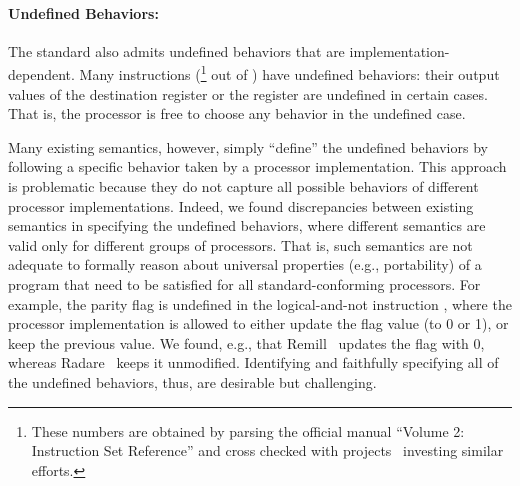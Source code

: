 


\paragraph{Undefined Behaviors:}
%
The \ISA standard also admits undefined behaviors that are implementation-dependent.
Many instructions (\undefIntel{}\footnote{\label{note1}These numbers are obtained by parsing the official manual ``Volume 2: Instruction Set Reference'' and cross checked with projects~\cite{Stoke2013, Felix} investing similar efforts.} out of \totalIntel{}) have undefined behaviors: their output values of the destination register or the  register are undefined in certain cases.
That is, the processor is free to choose any behavior in the undefined case.
%

Many existing semantics, however, simply ``define'' the undefined behaviors by
following a specific behavior taken by a processor implementation.
This approach is problematic because they do not capture all possible behaviors of different processor implementations.
Indeed, we found discrepancies between existing semantics in specifying the undefined behaviors, where different semantics are valid only for different groups of processors.
That is, such semantics are not adequate to formally reason about universal properties (e.g., portability) of a program that need to be satisfied for all standard-conforming processors.
%
For example, the parity flag  is undefined in the logical-and-not instruction , where the processor implementation is allowed to either update the flag value (to 0 or 1), or keep the previous value.
We found, e.g., that Remill~\cite{Remill} updates the flag with 0, whereas Radare~\cite{Radare2} keeps it unmodified.
%
Identifying and faithfully specifying all of the undefined behaviors, thus, are desirable but challenging.

